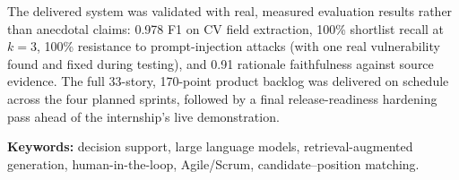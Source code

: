 \documentclass[12pt,a4paper]{report}
\begin{document}
The delivered system was validated with real, measured evaluation
results rather than anecdotal claims: 0.978 F1 on CV field extraction,
100\% shortlist recall at $k{=}3$, 100\% resistance to prompt-injection
attacks (with one real vulnerability found and fixed during testing),
and 0.91 rationale faithfulness against source evidence. The full
33-story, 170-point product backlog was delivered on schedule across the
four planned sprints, followed by a final release-readiness hardening
pass ahead of the internship's live demonstration.
\medskip

\noindent\textbf{Keywords:} decision support, large language models,
retrieval-augmented generation, human-in-the-loop, Agile/Scrum,
candidate--position matching.

\tableofcontents
\listoffigures
\listoftables
\end{document}
